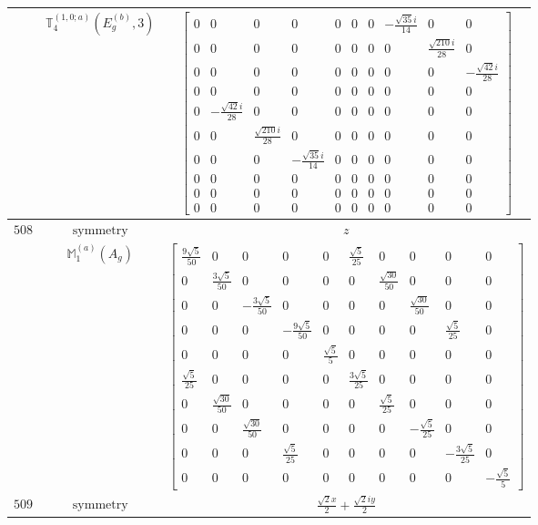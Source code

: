 \documentclass[fleqn,8pt,landscape]{jsarticle}
\begin{document}
\begin{longtable}{ccc}
$  $ & $ \mathbb{T}_{4}^{(1,0;a)}(E_{g}^{(b)},3) $ & $ \begin{bmatrix} 0 & 0 & 0 & 0 & 0 & 0 & 0 & - \frac{\sqrt{35} i}{14} & 0 & 0 \\ 0 & 0 & 0 & 0 & 0 & 0 & 0 & 0 & \frac{\sqrt{210} i}{28} & 0 \\ 0 & 0 & 0 & 0 & 0 & 0 & 0 & 0 & 0 & - \frac{\sqrt{42} i}{28} \\ 0 & 0 & 0 & 0 & 0 & 0 & 0 & 0 & 0 & 0 \\ 0 & - \frac{\sqrt{42} i}{28} & 0 & 0 & 0 & 0 & 0 & 0 & 0 & 0 \\ 0 & 0 & \frac{\sqrt{210} i}{28} & 0 & 0 & 0 & 0 & 0 & 0 & 0 \\ 0 & 0 & 0 & - \frac{\sqrt{35} i}{14} & 0 & 0 & 0 & 0 & 0 & 0 \\ 0 & 0 & 0 & 0 & 0 & 0 & 0 & 0 & 0 & 0 \\ 0 & 0 & 0 & 0 & 0 & 0 & 0 & 0 & 0 & 0 \\ 0 & 0 & 0 & 0 & 0 & 0 & 0 & 0 & 0 & 0 \end{bmatrix} $ \\ \hline
$ 508 $ & $ \text{symmetry} $ & $ z $ \\
$  $ & $ \mathbb{M}_{1}^{(a)}(A_{g}) $ & $ \begin{bmatrix} \frac{9 \sqrt{5}}{50} & 0 & 0 & 0 & 0 & \frac{\sqrt{5}}{25} & 0 & 0 & 0 & 0 \\ 0 & \frac{3 \sqrt{5}}{50} & 0 & 0 & 0 & 0 & \frac{\sqrt{30}}{50} & 0 & 0 & 0 \\ 0 & 0 & - \frac{3 \sqrt{5}}{50} & 0 & 0 & 0 & 0 & \frac{\sqrt{30}}{50} & 0 & 0 \\ 0 & 0 & 0 & - \frac{9 \sqrt{5}}{50} & 0 & 0 & 0 & 0 & \frac{\sqrt{5}}{25} & 0 \\ 0 & 0 & 0 & 0 & \frac{\sqrt{5}}{5} & 0 & 0 & 0 & 0 & 0 \\ \frac{\sqrt{5}}{25} & 0 & 0 & 0 & 0 & \frac{3 \sqrt{5}}{25} & 0 & 0 & 0 & 0 \\ 0 & \frac{\sqrt{30}}{50} & 0 & 0 & 0 & 0 & \frac{\sqrt{5}}{25} & 0 & 0 & 0 \\ 0 & 0 & \frac{\sqrt{30}}{50} & 0 & 0 & 0 & 0 & - \frac{\sqrt{5}}{25} & 0 & 0 \\ 0 & 0 & 0 & \frac{\sqrt{5}}{25} & 0 & 0 & 0 & 0 & - \frac{3 \sqrt{5}}{25} & 0 \\ 0 & 0 & 0 & 0 & 0 & 0 & 0 & 0 & 0 & - \frac{\sqrt{5}}{5} \end{bmatrix} $ \\ \hline
$ 509 $ & $ \text{symmetry} $ & $ \frac{\sqrt{2} x}{2} + \frac{\sqrt{2} i y}{2} $ \\

\end{longtable}
\end{document}
